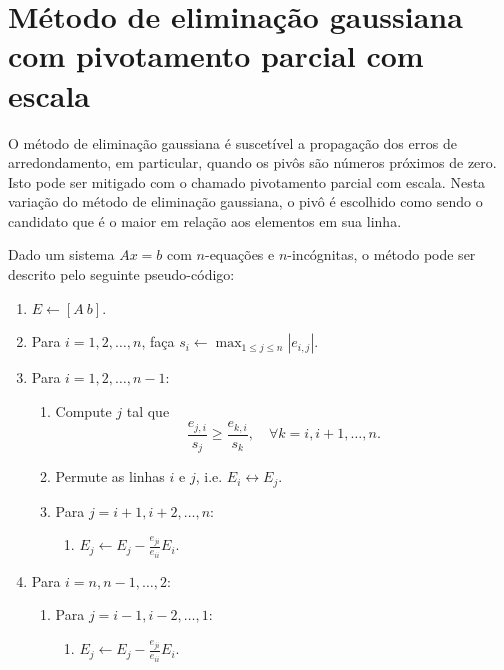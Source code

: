 \section{Método de eliminação gaussiana com pivotamento parcial com escala}\label{cap_sl_direto_sec_egauss_pivo}

O método de eliminação gaussiana é suscetível a propagação dos erros de arredondamento, em particular, quando os pivôs são números próximos de zero. Isto pode ser mitigado com o chamado pivotamento parcial com escala. Nesta variação do método de eliminação gaussiana, o pivô é escolhido como sendo o candidato que é o maior em relação aos elementos em sua linha.

Dado um sistema $Ax = b$ com $n$-equações e $n$-incógnitas, o método pode ser descrito pelo seguinte pseudo-código:
\begin{enumerate}
 \item $E \leftarrow [A ~ b]$.
 \item Para $i=1, 2, \dotsc, n$, faça $s_i \leftarrow \max_{1\leq j \leq n}|e_{i,j}|$.
 \item Para $i=1, 2, \dotsc, n-1$:
   \begin{enumerate}[3.1]
   \item Compute $j$ tal que
     \begin{equation}
       \frac{e_{j,i}}{s_j} \geq \frac{e_{k,i}}{s_k},\quad\forall k=i, i+1, \dotsc, n.
     \end{equation}
     \item Permute as linhas $i$ e $j$, i.e. $E_i \leftrightarrow E_j$.
     \item Para $j=i+1, i+2, \dotsc, n$:
       \begin{enumerate}[3.3.1]
       \item $E_j \leftarrow E_j - \frac{e_{ji}}{e_{ii}}E_i$.
       \end{enumerate}
   \end{enumerate}
 \item Para $i=n, n-1, \dotsc, 2$:   
   \begin{enumerate}[4.1]
     \item Para $j=i-1, i-2, \dotsc, 1$:
       \begin{enumerate}[4.1.1]
         \item $E_j \leftarrow E_j - \frac{e_{ji}}{e_{ii}}E_i$.
       \end{enumerate}
   \end{enumerate}
\end{enumerate}

